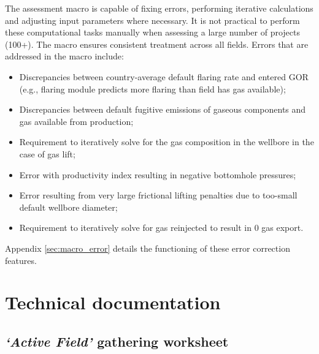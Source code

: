 \documentclass[11pt]{report}
\newcommand{\sheet}[1]{\textit{`{#1}'}}
\begin{document}
The assessment macro is capable of fixing errors, performing iterative calculations and adjusting input parameters where necessary. It is not practical to perform these computational tasks manually when assessing a large number of projects (100+). The macro ensures consistent treatment across all fields. Errors that are addressed in the macro include:
\begin{itemize}
\item Discrepancies between country-average default flaring rate and entered GOR (e.g., flaring module predicts more flaring than field has gas available);
\item Discrepancies between default fugitive emissions of gaseous components and gas available from production;
\item Requirement to iteratively solve for the gas composition in the wellbore in the case of gas lift;
\item Error with productivity index resulting in negative bottomhole pressures;
\item Error resulting from very large frictional lifting penalties due to too-small default wellbore diameter;
\item Requirement to iteratively solve for gas reinjected to result in 0 gas export.
\end{itemize}
Appendix \ref{sec:macro_error} details the functioning of these error correction features.







\part{Technical documentation}







\chapter{\sheet{Active Field} gathering worksheet}
\label{sec:active_field}
\end{document}
